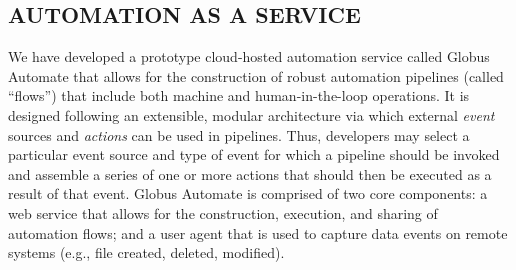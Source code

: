 \documentclass{aip-cp}
\begin{document}



\subsection{AUTOMATION AS A SERVICE}

We have developed a prototype cloud-hosted automation service called Globus Automate
that allows for the construction of robust automation pipelines (called ``flows'')
that include both machine and human-in-the-loop operations. 
It is designed following an extensible, modular architecture via which external
\emph{event} sources and \emph{actions} can be used in pipelines. 
Thus, developers may select a particular event source and type of event
for which a pipeline should be invoked and assemble a 
series of one or more actions that should then be executed as 
a result of that event.
Globus Automate is comprised of two core components: a web service
that allows for the construction, execution, and sharing of automation
flows; and a user agent that is used to capture data events on remote systems
(e.g., file created, deleted, modified). 
\end{document}
